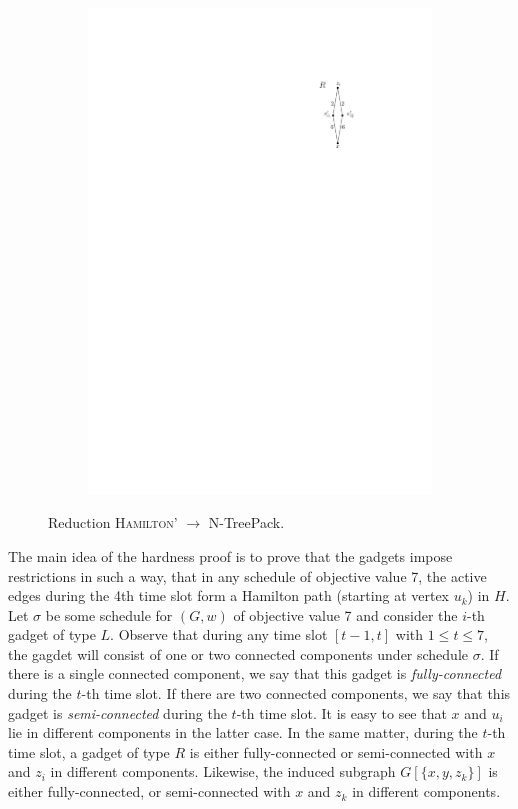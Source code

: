 \documentclass[runningheads]{llncs}
\newcommand{\set}[1]{\{ #1 \}}
\newcommand{\xxxNTP}{{\sc N-TreePack}}
\begin{document}
\begin{figure}[htpb]
\begin{subfigure}[b]{0.15\textwidth}
         \includegraphics[scale=1]{img/act-hamilton-cycle-c}
         \label{fig:act-hamilton-cycle-c}
     \end{subfigure}
        \caption{Reduction \textsc{Hamilton'} $\rightarrow$ {\xxxNTP}.}
        \label{fig_act_hamilton_cycle}
\end{figure}

The main idea of the hardness proof is to prove that the gadgets impose restrictions in such a way, that in any schedule of objective value 7, the active edges during the 4th time slot form a Hamilton path (starting at vertex $u_k$) in $H$. Let $\sigma$ be some schedule for $(G, w)$ of objective value 7 and consider the $i$-th gadget of type $L$. Observe that during any time slot $[t-1, t]$ with $1 \leq t \leq 7$, the gagdet will consist of one or two connected components under schedule $\sigma$. If there is a single connected component, we say that this gadget is \emph{fully-connected} during the $t$-th time slot. If there are two connected components, we say that this gadget is \emph{semi-connected} during the $t$-th time slot. It is easy to see that $x$ and $u_i$ lie in different components in the latter case. In the same matter, during the $t$-th time slot, a gadget of type $R$ is either fully-connected or semi-connected with $x$ and $z_i$ in different components. Likewise, the induced subgraph $G[\set{x, y, z_k}]$ is either fully-connected, or semi-connected with $x$ and $z_k$ in different components.
\end{document}
